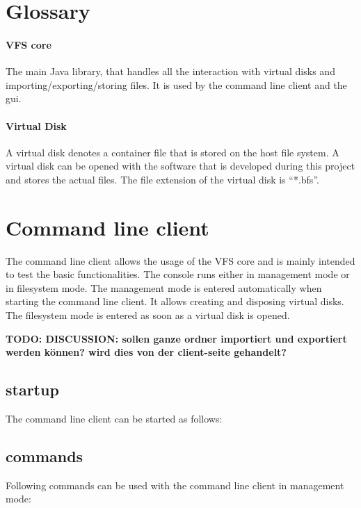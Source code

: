 \section{Glossary}

\paragraph{VFS core} The main Java library, that handles all the interaction
with virtual disks and importing/exporting/storing files. It is used by the
command line client and the gui.

\paragraph{Virtual Disk} A virtual disk denotes a container file that is stored
on the host file system. A virtual disk can be opened with the software that is
developed during this project and stores the actual files. The file extension of
the virtual disk is ``*.bfs''.


\section{Command line client}

The command line client allows the usage of the VFS core and is mainly intended
to test the basic functionalities. The console runs either in  management mode
or in filesystem mode. The management mode is entered automatically when
starting the command line client. It allows creating and disposing virtual
disks. The filesystem mode is entered as soon as a virtual disk is opened.

\textbf{TODO: DISCUSSION: sollen ganze ordner importiert und exportiert werden
können? wird dies von der client-seite gehandelt?}

\subsection{startup}
The command line client can be started as follows:


\subsection{commands}
Following commands can be used with the command line client in management mode:

